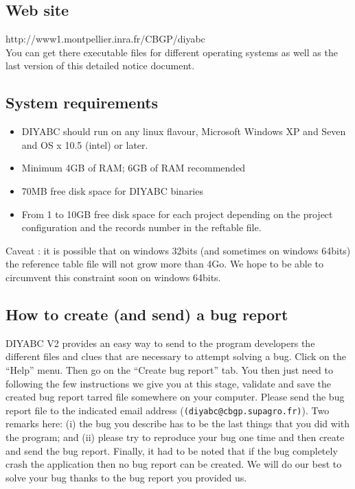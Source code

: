 \documentclass [a4paper]{report}
\let\subsectionv\subsection
\renewcommand{\subsection}[1]{\subsectionv{#1} \setcounter{paragraph}{0}}
\begin{document}
\subsection{Web site}
http://www1.montpellier.inra.fr/CBGP/diyabc\\
You can get there executable files for different operating systems as well as the last version of this detailed notice document.



\subsection{System requirements}
\begin{itemize}
\item DIYABC should run on any linux flavour, Microsoft Windows XP and Seven and OS x 10.5 (intel) or later.
\item Minimum 4GB of RAM; 6GB of RAM recommended 
\item 70MB free disk space for DIYABC binaries
\item From 1 to 10GB free disk space for each project depending on the project configuration and the records number in the reftable file.
\end{itemize}

Caveat : it is possible that on windows 32bits (and sometimes on windows 64bits) the reference table file will not grow more than 4Go. We hope to be able to circumvent this constraint soon on windows 64bits.

\subsection{How to create (and send) a bug report}
DIYABC V2 provides an easy way to send to the program developers the different files and clues that are necessary to attempt solving a bug. Click on the “Help” menu. Then go on the “Create bug report” tab. You then just need to following the few instructions we give you at this stage, validate and save the created bug report tarred file somewhere on your computer. Please send the bug report file to the indicated email address (\texttt{(diyabc@cbgp.supagro.fr)}). Two remarks here: (i) the bug you describe has to be the last things that you did with the program; and (ii) please try to reproduce your bug one time and then create and send the bug report. Finally, it had to be noted that if the bug completely crash the application then no bug report can be created. We will do our best to solve your bug thanks to the bug report you provided us.
\end{document}
